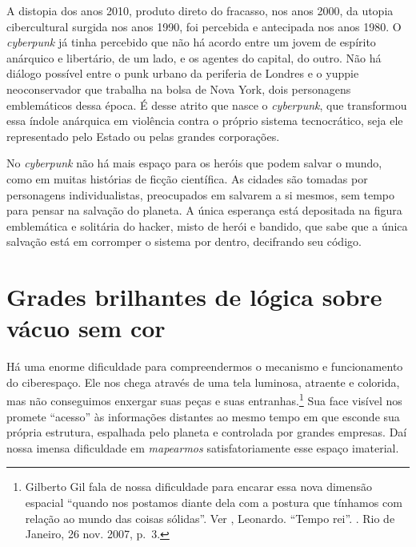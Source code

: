 A distopia dos anos 2010, produto direto do fracasso, nos anos 2000, da
utopia cibercultural surgida nos anos 1990, foi percebida e antecipada
nos anos 1980. O \emph{cyberpunk} já tinha percebido que não há acordo
entre um jovem de espírito anárquico e libertário, de um lado, e os
agentes do capital, do outro. Não há diálogo possível entre o punk
urbano da periferia de Londres e o yuppie neoconservador que trabalha na
bolsa de Nova York, dois personagens emblemáticos dessa época. É desse
atrito que nasce o \emph{cyberpunk}, que transformou essa índole
anárquica em violência contra o próprio sistema tecnocrático, seja ele
representado pelo Estado ou pelas grandes corporações.

No \emph{cyberpunk} não há mais espaço para os heróis que podem salvar o mundo,
como em muitas histórias de ficção científica. As cidades são tomadas
por personagens individualistas, preocupados em salvarem a si mesmos, sem
tempo para pensar na salvação do planeta. A única esperança está
depositada na figura emblemática e solitária do hacker, misto de herói e
bandido, que sabe que a única salvação está em corromper o sistema por
dentro, decifrando seu código.

\chapter{Grades brilhantes de lógica sobre vácuo sem cor}

Há uma enorme dificuldade para compreendermos o mecanismo e
funcionamento do ciberespaço. Ele nos chega através de uma tela
luminosa, atraente e colorida, mas não conseguimos enxergar suas peças e
suas entranhas.\footnote{Gilberto Gil fala de nossa dificuldade para
  encarar essa nova dimensão espacial ``quando nos postamos diante dela
  com a postura que tínhamos com relação ao mundo das coisas sólidas''.
  Ver , Leonardo. ``Tempo rei''. {}. Rio de Janeiro, 26
  nov. 2007, p.~3.} Sua face visível nos promete ``acesso'' às
informações distantes ao mesmo tempo em que esconde sua própria
estrutura, espalhada pelo planeta e controlada por grandes empresas. Daí
nossa imensa dificuldade em \emph{mapearmos} satisfatoriamente esse
espaço imaterial.

